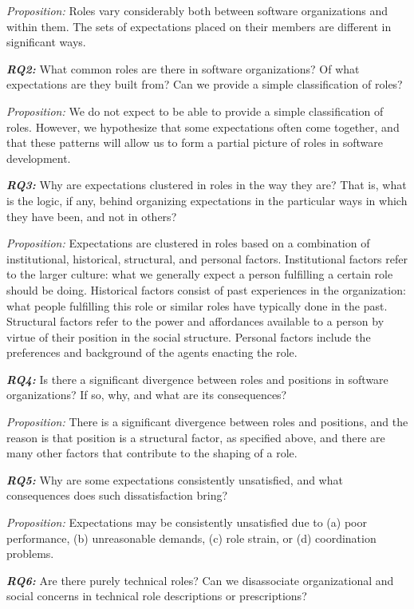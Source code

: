 \documentclass[10pt, conference, compsocconf]{IEEEtran}
\begin{document}
\emph{Proposition:} Roles vary considerably both between software organizations and within them. The sets of expectations placed on their members are different in significant ways.

\textbf{\emph{RQ2:}} What common roles are there in software organizations? Of what expectations are they built from? Can we provide a simple classification of roles?

\emph{Proposition:} We do not expect to be able to provide a simple classification of roles. However, we hypothesize that some expectations often come together, and that these patterns will allow us to form a partial picture of roles in software development.

\textbf{\emph{RQ3:}} Why are expectations clustered in roles in the way they are? That is, what is the logic, if any, behind organizing expectations in the particular ways in which they have been, and not in others?

\emph{Proposition:} Expectations are clustered in roles based on a combination of institutional, historical, structural, and personal factors. Institutional factors refer to the larger culture: what we generally expect a person fulfilling a certain role should be doing. Historical factors consist of past experiences in the organization: what people fulfilling this role or similar roles have typically done in the past. Structural factors refer to the power and affordances available to a person by virtue of their position in the social structure. Personal factors include the preferences and background of the agents enacting the role.

\textbf{\emph{RQ4:}} Is there a significant divergence between roles and positions in software organizations? If so, why, and what are its consequences?

\emph{Proposition:} There is a significant divergence between roles and positions, and the reason is that position is a structural factor, as specified above, and there are many other factors that contribute to the shaping of a role.

\textbf{\emph{RQ5:}} Why are some expectations consistently unsatisfied, and what consequences does such dissatisfaction bring?

\emph{Proposition:} Expectations may be consistently unsatisfied due to (a) poor performance, (b) unreasonable demands, (c) role strain, or (d) coordination problems.

\textbf{\emph{RQ6:}} Are there purely technical roles? Can we disassociate organizational and social concerns in technical role descriptions or prescriptions?
\end{document}
